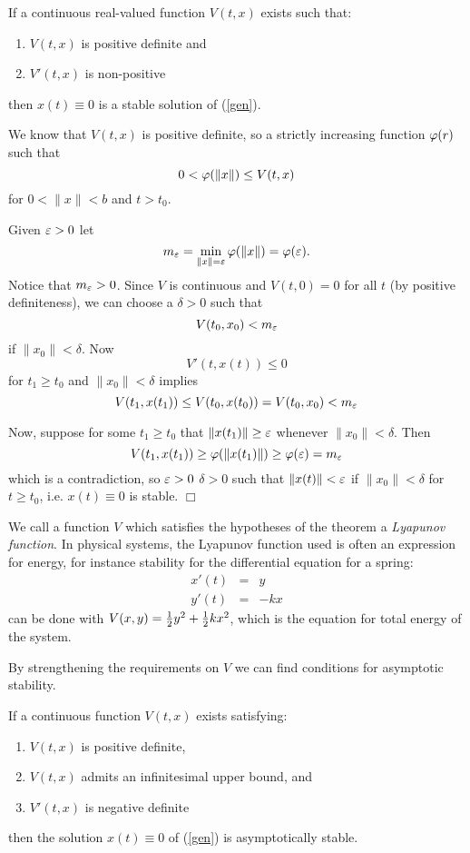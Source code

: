 \documentclass[nols]{tufte-handout}
\theoremstyle{definition}
\begin{document}
\begin{thm}
	If a continuous real-valued function $V(t,x)$ exists such that:
\begin{enumerate}
\item $V(t,x)$ is positive definite and
\item $V'(t,x)$ is non-positive
\end{enumerate}
then $x(t) \equiv 0$ is a stable solution of (\ref{gen}).
\end{thm}

\pf We know that $V(t,x)$ is positive definite, so \e a strictly
increasing function $\varphi (r)$ such that 
$$0 < \varphi (\| x \| ) \le V(t,x)$$
for $0 < \| x \| < b$ and $t > t_0$.

Given $\varepsilon > 0$ let 
$$m_{\varepsilon} = \min_{\| x \| = \varepsilon} \varphi (\| x \| ) = \varphi (\varepsilon).$$ Notice that
$m_{\varepsilon} > 0$.  Since $V$ is continuous and $V(t,0) = 0$ for all $t$
(by positive definiteness),
we can choose a $\delta > 0$ such that 
$$V(t_0, x_0) < m_{\varepsilon}$$ 
if $\|x_0 \| < \delta$.  Now 
$$V'(t,x(t)) \le 0$$ 
for $t_1 \ge t_0$ and $\| x_0 \| < \delta$ implies
$$V(t_1, x(t_1)) \le V(t_0,x(t_0)) = V(t_0,x_0) < m_{\varepsilon}$$

Now, suppose for some $t_1 \ge t_0$ that $\| x(t_1) \| \ge \varepsilon$
whenever $\| x_0 \| < \delta$.  Then 
$$V(t_1,x(t_1)) \ge \varphi (\| x(t_1) \| ) \ge \varphi (\varepsilon) =
m_{\varepsilon}$$
which is a contradiction, so \a $\varepsilon > 0$ \e $\delta > 0$ such that
$\| x(t) \| < \varepsilon$ if $\| x_0 \| < \delta$ for $t \ge t_0$,
i.e. $x(t) \equiv 0$ is stable.  $\Box$

We call a function $V$ which satisfies the hypotheses of the theorem a
{\em Lyapunov function}.  In physical systems, the Lyapunov function
used is often an expression for energy, for instance stability for the
differential equation for a spring: 
\begin{eqnarray*}
x'(t) & = & y\\
y'(t) & = & -kx
\end{eqnarray*}
can be done with $V(x,y) = {1 \over 2} y^2 + {1 \over 2} k x^2$, which is the equation
for total energy of the system.

By strengthening the requirements on $V$ we can find conditions for
asymptotic stability.

\begin{thm}
	If a continuous function $V(t,x)$ exists satisfying:
\begin{enumerate}
\item $V(t,x)$ is positive definite,
\item $V(t,x)$ admits an infinitesimal upper bound, and
\item $V'(t,x)$ is negative definite
\end{enumerate}
then the solution $x(t) \equiv 0$ of (\ref{gen}) is asymptotically
stable.
\end{thm}
\end{document}
